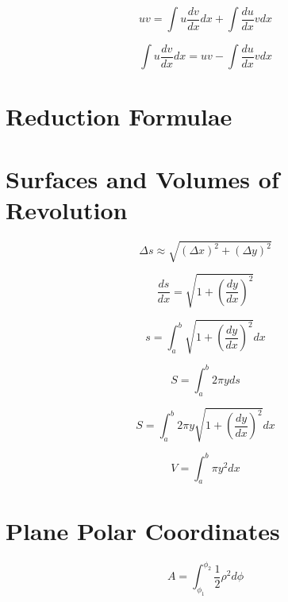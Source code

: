 \begin{equation*}
    uv = \int u \frac{dv}{dx} dx + \int \frac{du}{dx}vdx
\end{equation*}
    
\begin{equation*}
    \int u \frac{dv}{dx} dx = uv - \int \frac{du}{dx}vdx
\end{equation*}

\section{Reduction Formulae}

\section{Surfaces and Volumes of Revolution}

\begin{equation*}
    \Delta s \approx \sqrt{(\Delta x)^{2} + (\Delta y)^{2}}
\end{equation*}

\begin{equation*}
    \frac{ds}{dx} = \sqrt{1 + \left(\frac{dy}{dx}\right)^2}
\end{equation*}

\begin{equation*}
    s = \int_{a}^{b}\sqrt{1 + \left(\frac{dy}{dx}\right)^{2}}dx
\end{equation*}

\begin{equation*}
    S = \int_{a}^{b} 2 \pi y ds
\end{equation*}

\begin{equation*}
    S = \int_{a}^{b} 2 \pi y \sqrt{1 + \left(\frac{dy}{dx}\right)^{2}}dx
\end{equation*}

\begin{equation*}
    V = \int_{a}^{b} \pi y^{2} dx
\end{equation*}

\section{Plane Polar Coordinates}

\begin{center}
\end{center}

\begin{equation*}
    A = \int_{\phi_1}^{\phi_2}\frac{1}{2}\rho^2 d\phi
\end{equation*}